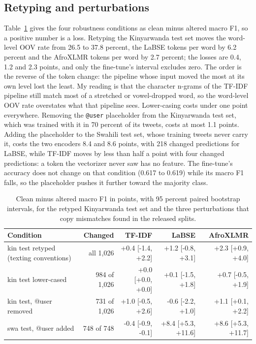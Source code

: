 \documentclass[11pt]{article}
\begin{document}
\subsection{Retyping and perturbations}
Table~\ref{tab:robust} gives the four robustness conditions as clean minus altered macro F1, so a positive number is a loss. Retyping the Kinyarwanda test set moves the word-level OOV rate from 26.5 to 37.8 percent, the LaBSE tokens per word by 6.2 percent and the AfroXLMR tokens per word by 2.7 percent; the losses are 0.4, 1.2 and 2.3 points, and only the fine-tune's interval excludes zero. The order is the reverse of the token change: the pipeline whose input moved the most at its own level lost the least. My reading is that the character n-grams of the TF-IDF pipeline still match most of a stretched or vowel-dropped word, so the word-level OOV rate overstates what that pipeline sees. Lower-casing costs under one point everywhere. Removing the \texttt{@user} placeholder from the Kinyarwanda test set, which was trained with it in 70 percent of its tweets, costs at most 1.1 points. Adding the placeholder to the Swahili test set, whose training tweets never carry it, costs the two encoders 8.4 and 8.6 points, with 218 changed predictions for LaBSE, while TF-IDF moves by less than half a point with four changed predictions: a token the vectorizer never saw has no feature. The fine-tune's accuracy does not change on that condition (0.617 to 0.619) while its macro F1 falls, so the placeholder pushes it further toward the majority class.

\begin{table}[t]
\centering
\footnotesize
\begin{tabular}{lrrrr}
\toprule
Condition & Changed & TF-IDF & LaBSE & AfroXLMR \\
\midrule
kin test retyped (texting conventions) & all 1,026 & +0.4 [-1.4, +2.2] & +1.2 [-0.8, +3.1] & +2.3 [+0.9, +4.0] \\
kin test lower-cased & 984 of 1,026 & +0.0 [+0.0, +0.0] & +0.1 [-1.5, +1.8] & +0.7 [-0.5, +1.9] \\
kin test, @user removed & 731 of 1,026 & +1.0 [-0.5, +2.6] & -0.6 [-2.2, +1.0] & +1.1 [+0.1, +2.2] \\
swa test, @user added & 748 of 748 & -0.4 [-0.9, -0.1] & +8.4 [+5.3, +11.6] & +8.6 [+5.3, +11.7] \\
\bottomrule
\end{tabular}
\caption{Clean minus altered macro F1 in points, with 95 percent paired bootstrap intervals, for the retyped Kinyarwanda test set and the three perturbations that copy mismatches found in the released splits.}
\label{tab:robust}
\end{table}
\end{document}
